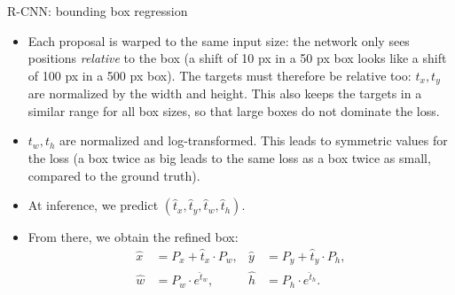 \documentclass[xcolor=pdftex,dvipsnames,table]{beamer}
\begin{document}

\begin{frame}{R-CNN: bounding box regression}
\begin{itemize}
   \item Each proposal is warped to the same input size: the network only sees positions \emph{relative} to the box (a shift of 10 px in a 50 px box looks like a shift of 100 px in a 500 px box). The targets must therefore be relative too: $t_x,t_y$ are normalized by the width and height. This also keeps the targets in a similar range for all box sizes, so that large boxes do not dominate the loss.
   \item $t_w,t_h$ are normalized and log-transformed. This leads to symmetric values for the loss (a box twice as big leads to the same loss as a box twice as small, compared to the ground truth). 
   \item At inference, we predict $(\hat{t}_x, \hat{t}_y, \hat{t}_w, \hat{t}_h)$. 
   \item From there, we obtain the refined box: 
   \begin{align}
   \hat{x} &= P_x + \hat{t}_x \cdot P_w, &
   \hat{y} &= P_y + \hat{t}_y \cdot P_h, \nonumber \\
   \hat{w} &= P_w \cdot e^{\hat{t}_w}, &
   \hat{h} &= P_h \cdot e^{\hat{t}_h}.
   \end{align}
\end{itemize}
\end{frame}
\end{document}
